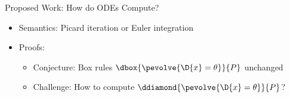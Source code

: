 \documentclass[slidestop,aspectratio=169]{beamer}
\newcommand{\xgvar}{\textsf{x}}
\newcommand{\ygvar}{\textsf{y}}
\newcommand{\kvar}{\textsf{k}}
\newcommand{\tvar}{\textsf{t}}
\newcommand{\Tvar}{{\sf T}\xspace}
\newcommand{\vvar}{{\sf v}\xspace}
\newcommand{\avar}{{\sf a}\xspace}
\newcommand{\ctrl}{\textsf{ctrl}\xspace}
\newcommand{\plant}{\textsf{plant}\xspace}
\theoremstyle{plain}
\theoremstyle{definition}
\theoremstyle{remark}
\newcommand{\ctrlcolor}[1]{{\color{vred}{#1}}}
\newcommand{\plantcolor}[1]{{\color{vblue}{#1}}}
\begin{document}





\begin{frame}[t]{Proposed Work: How do ODEs Compute?}
  \begin{itemize}
  \item Semantics: Picard iteration or Euler integration
  \item Proofs:
\begin{itemize}
  \item Conjecture: Box rules $\dbox{\pevolve{\D{x}=\theta}}{P}$ unchanged
  \item Challenge: How to compute $\ddiamond{\pevolve{\D{x}=\theta}}{P}$?
\end{itemize}
  \end{itemize}
\end{frame}
\end{document}

